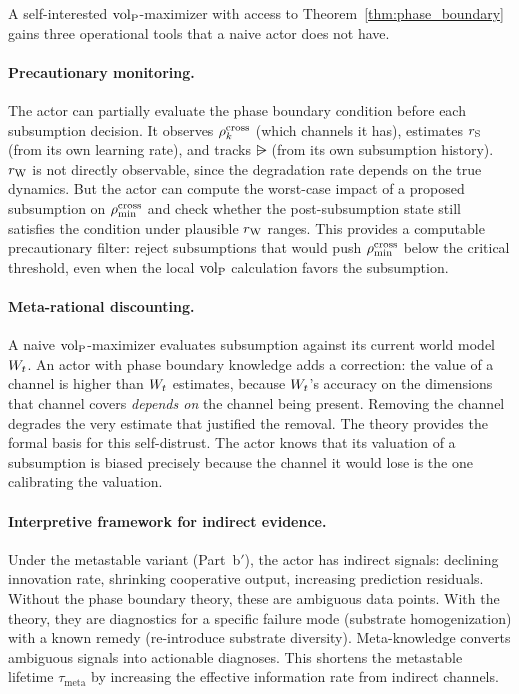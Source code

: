 A self-interested ${\operatorname{vol}_{\mathrm{P}}}$-maximizer with access to
Theorem~\ref{thm:phase_boundary} gains three operational tools that a
naive actor does not have.

\paragraph{Precautionary monitoring.}
The actor can partially evaluate the phase boundary condition before
each subsumption decision.  It observes $\rho^{\mathrm{cross}}_k$ (which channels
it has), estimates $r_{\mathrm{S}}$ (from its own learning rate), and tracks
$\rsub$ (from its own subsumption history).  $r_{\mathrm{W}}$ is not directly
observable, since the degradation rate depends on the true dynamics.
But the actor can compute the worst-case impact of a proposed
subsumption on $\rho_{\min}^{\mathrm{cross}}$ and check whether the post-subsumption
state still satisfies the condition under plausible $r_{\mathrm{W}}$ ranges.
This provides a computable precautionary filter: reject subsumptions
that would push $\rho_{\min}^{\mathrm{cross}}$ below the critical threshold, even when
the local ${\operatorname{vol}_{\mathrm{P}}}$ calculation favors the subsumption.

\paragraph{Meta-rational discounting.}
A naive ${\operatorname{vol}_{\mathrm{P}}}$-maximizer evaluates subsumption against its current
world model $W_t$.  An actor with phase boundary knowledge adds a
correction: the value of a channel is higher than $W_t$ estimates,
because $W_t$'s accuracy on the dimensions that channel covers
\emph{depends on} the channel being present.  Removing the channel
degrades the very estimate that justified the removal.  The theory
provides the formal basis for this self-distrust.  The actor knows
that its valuation of a subsumption is biased precisely because the
channel it would lose is the one calibrating the valuation.

\paragraph{Interpretive framework for indirect evidence.}
Under the metastable variant (Part~b$'$), the actor has indirect
signals: declining innovation rate, shrinking cooperative output,
increasing prediction residuals.  Without the phase boundary theory,
these are ambiguous data points.  With the theory, they are
diagnostics for a specific failure mode (substrate homogenization)
with a known remedy (re-introduce substrate diversity).
Meta-knowledge converts ambiguous signals into actionable diagnoses.
This shortens the metastable lifetime $\tau_{\mathrm{meta}}$ by
increasing the effective information rate from indirect channels.

